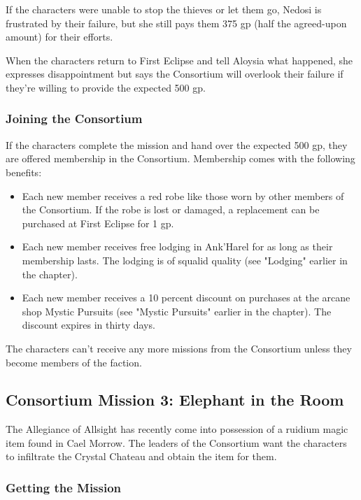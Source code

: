 \documentclass[letterpaper, 11pt, bg=full, twocolumn]{dndbook}
\begin{document}
If the characters were unable to stop the thieves or let them go, Nedosi is frustrated by their failure, but she still pays them 375 gp (half the agreed-upon amount) for their efforts.

When the characters return to First Eclipse and tell Aloysia what happened, she expresses disappointment but says the Consortium will overlook their failure if they're willing to provide the expected 500 gp.

\subsubsection{Joining the Consortium}

If the characters complete the mission and hand over the expected 500 gp, they are offered membership in the Consortium. Membership comes with the following benefits:

\begin{itemize}
\item Each new member receives a red robe like those worn by other members of the Consortium. If the robe is lost or damaged, a replacement can be purchased at First Eclipse for 1 gp.
\item Each new member receives free lodging in Ank'Harel for as long as their membership lasts. The lodging is of squalid quality (see "Lodging" earlier in the chapter).
\item Each new member receives a 10 percent discount on purchases at the arcane shop Mystic Pursuits (see "Mystic Pursuits" earlier in the chapter). The discount expires in thirty days.
\end{itemize}

The characters can't receive any more missions from the Consortium unless they become members of the faction.

\subsection{Consortium Mission 3: Elephant in the Room}

The Allegiance of Allsight has recently come into possession of a ruidium magic item found in Cael Morrow. The leaders of the Consortium want the characters to infiltrate the Crystal Chateau and obtain the item for them.

\subsubsection{Getting the Mission}
\end{document}
